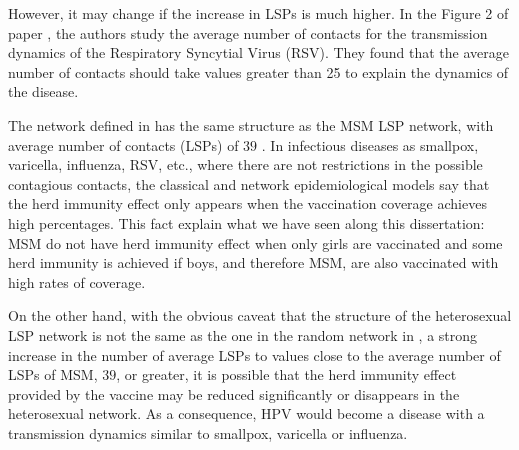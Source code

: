 However, it may change if the increase in LSPs is much higher. In the Figure 2 of paper \cite{acedo2011using}, the authors study the average number of contacts for the transmission dynamics of the Respiratory Syncytial Virus (RSV). They found that the average number of contacts should take values greater than 25 to explain the dynamics of the disease.

The network defined in \cite{acedo2011using} has the same structure as the MSM LSP network, with average number of contacts (LSPs) of $39$ \cite{Durex2002}. In infectious diseases as smallpox, varicella, influenza, RSV, etc., where there are not restrictions in the possible contagious contacts, the classical and network epidemiological models say that the herd immunity effect only appears when the vaccination coverage achieves high percentages. This fact explain what we have seen along this dissertation: MSM do not have herd immunity effect when only girls are vaccinated and some herd immunity is achieved if boys, and therefore MSM, are also vaccinated with high rates of coverage.

On the other hand, with the obvious caveat that the structure of the heterosexual LSP network is not the same as the one in the random network in \cite{acedo2011using}, a strong increase in the number of average LSPs to values close to the average number of LSPs of MSM, $39$, or greater, it is possible that the herd immunity effect provided by the vaccine may be reduced significantly or disappears in the heterosexual network. As a consequence,  HPV would become a disease with a transmission dynamics similar to smallpox, varicella or influenza. 
